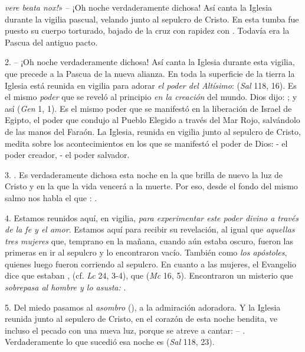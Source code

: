 \begin{body}
 {} \textit{vere beata nox!}» -- ¡Oh noche verdaderamente dichosa! Así canta la Iglesia durante la vigilia pascual, velando junto al sepulcro de Cristo. En esta tumba fue puesto su cuerpo torturado, bajado de la cruz con rapidez con . Todavía era la Pascua del antiguo pacto. 

2.  – ¡Oh noche verdaderamente dichosa! Así canta la Iglesia durante esta vigilia, que precede a la Pascua de la nueva alianza. En toda la superficie de la tierra la Iglesia está reunida en vigilia para adorar \textit{el poder del Altísimo}:  (\textit{Sal} 118, 16). Es el mismo \textit{poder} que se reveló al principio \textit{en la creación} del mundo. Dios dijo: ; y así  (\textit{Gen} 1, 1). Es el mismo poder que se manifestó en la liberación de Israel de Egipto, el poder que condujo al Pueblo Elegido a través del Mar Rojo, salvándolo de las manos del Faraón. La Iglesia, reunida en vigilia junto al sepulcro de Cristo, medita sobre los acontecimientos en los que se manifestó el poder de Dios: - el poder creador, - el poder salvador. 

3. . Es verdaderamente dichosa esta noche en la que brilla de nuevo la luz de Cristo y en la que la vida vencerá a la muerte. Por eso, desde el fondo del mismo salmo nos habla el que : . 

4. Estamos reunidos aquí, en vigilia, \textit{para experimentar este poder divino a través de la fe y el amor}. Estamos aquí para recibir su revelación, al igual que \textit{aquellas tres mujeres} que, temprano en la mañana, cuando aún estaba oscuro, fueron las primeras en ir al sepulcro y lo encontraron vacío. También como \textit{los apóstoles}, quienes luego fueron corriendo al sepulcro. En cuanto a las mujeres, el Evangelio dice que estaban ,  (cf. \textit{Lc} 24, 3-4), que  (\textit{Mc} 16, 5). Encontraron un misterio que \textit{sobrepasa al hombre y lo asusta: }. 

5. Del miedo pasamos al \textit{asombro} (), a la admiración adoradora. Y la Iglesia reunida junto al sepulcro de Cristo, en el corazón de esta noche bendita, ve incluso el pecado con una nueva luz, porque se atreve a cantar:  –  . Verdaderamente lo que sucedió esa noche es  (\textit{Sal} 118, 23). 


\end{body}

